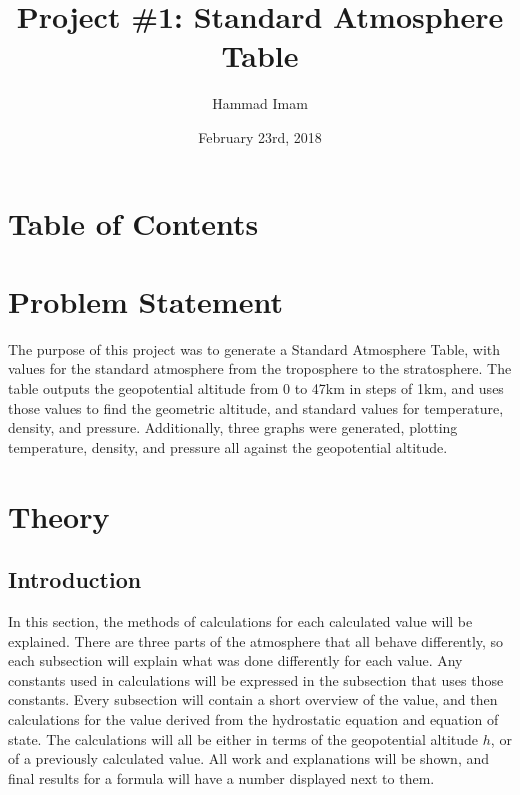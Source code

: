 \documentclass{article}
\title{Project \#1: Standard Atmosphere Table}
\author{Hammad Imam}
\date{February 23rd, 2018}
\begin{document}
\maketitle

\tableofcontents

\section*{Table of Contents}




\section{Problem Statement}
The purpose of this project was to generate a Standard Atmosphere Table, with values for the standard atmosphere from the troposphere to the stratosphere. The table outputs the geopotential altitude from 0 to 47km in steps of 1km, and uses those values to find the geometric altitude, and standard values for temperature, density, and pressure. Additionally, three graphs were generated, plotting temperature, density, and pressure all against the geopotential altitude. 

\section{Theory}
\subsection{Introduction}
In this section, the methods of calculations for each calculated value will be explained. There are three parts of the atmosphere that all behave differently, so each subsection will explain what was done differently for each value. Any constants used in calculations will be expressed in the subsection that uses those constants. Every subsection will contain a short overview of the value, and then calculations for the value derived from the hydrostatic equation and equation of state. The calculations will all be either in terms of the geopotential altitude $h$, or of a previously calculated value. All work and explanations will be shown, and final results for a formula will have a number displayed next to them.
\end{document}
